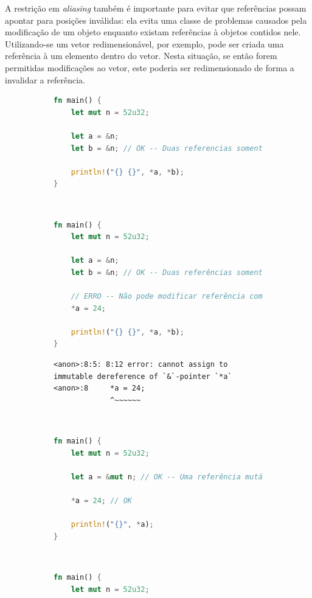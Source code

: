 \documentclass[tg]{mdtufsm}
\begin{document}
A restrição em \emph{aliasing} também é importante para evitar que referências possam apontar para posições inválidas: ela evita uma classe de problemas causados pela modificação de um objeto enquanto existam referências à objetos contidos nele. Utilizando-se um vetor redimensionável, por exemplo, pode ser criada uma referência à um elemento dentro do vetor. Nesta situação, se então forem permitidas modificações ao vetor, este poderia ser redimensionado de forma a invalidar a referência. \citep{rust-lifetimes}

\begin{figure}
	\centering
	\begin{subfigure}[c]{0.48\textwidth}
	\begin{lstlisting}[language=Rust]
fn main() {
	let mut n = 52u32;

	let a = &n;
	let b = &n; // OK -- Duas referencias somente-leitura

	println!("{} {}", *a, *b);
}
	\end{lstlisting}
	\caption{}
	\label{code:aliasing:shared1}
	\end{subfigure}
	~~~
	\begin{subfigure}[c]{0.48\textwidth}
	\begin{lstlisting}[language=Rust]
fn main() {
	let mut n = 52u32;

	let a = &n;
	let b = &n; // OK -- Duas referências somente-leitura

	// ERRO -- Não pode modificar referência compartilhada
	*a = 24;

	println!("{} {}", *a, *b);
}
	\end{lstlisting}
	\begin{lstlisting}[numbers=none, breaklines=true]
<anon>:8:5: 8:12 error: cannot assign to immutable dereference of `&`-pointer `*a`
<anon>:8     *a = 24;
             ^~~~~~~
	\end{lstlisting}
	\caption{}
	\label{code:aliasing:shared2}
	\end{subfigure}
	\\[2em]
	\begin{subfigure}[c]{0.48\textwidth}
	\begin{lstlisting}[language=Rust]
fn main() {
	let mut n = 52u32;

	let a = &mut n; // OK -- Uma referência mutável

	*a = 24; // OK

	println!("{}", *a);
}
	\end{lstlisting}
	\caption{}
	\label{code:aliasing:mut1}
	\end{subfigure}
	~~~
	\begin{subfigure}[c]{0.48\textwidth}
	\begin{lstlisting}[language=Rust]
fn main() {
	let mut n = 52u32;


\end{lstlisting}
\end{subfigure}
\end{figure}
\end{document}
